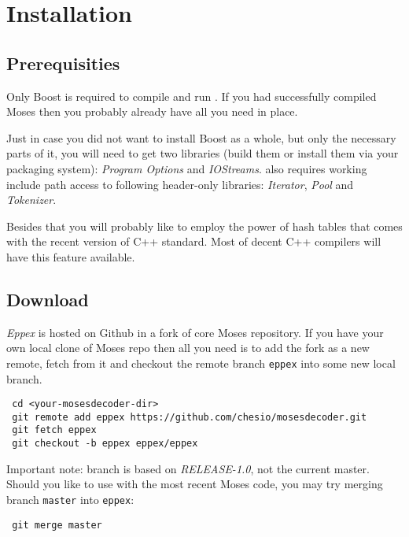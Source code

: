 \chapter{Installation}
\label{chap:installation}


\section*{Prerequisities}

Only Boost is required to compile and run \eppex{}.
If you had successfully compiled Moses then you probably already have all you need in place.

Just in case you did not want to install Boost as a whole, but only the necessary
parts of it, you will need to get two libraries (build them or install
them via your packaging system): \emph{Program Options} and \emph{IOStreams}.
\Eppex{} also requires working include path access to following
header-only libraries: \emph{Iterator}, \emph{Pool} and \emph{Tokenizer}.

Besides that you will probably like to employ the power of hash tables
that comes with the recent version of C++ standard.
Most of decent C++ compilers will have this feature available.

\section*{Download}

\emph{Eppex} is hosted on Github in
a fork
of core Moses repository.
If you have your own local clone of Moses repo then all you need is to add
the fork as a new remote, fetch from it and checkout the remote branch
\texttt{eppex} into some new local branch.
\begin{verbatim}
 cd <your-mosesdecoder-dir>
 git remote add eppex https://github.com/chesio/mosesdecoder.git
 git fetch eppex
 git checkout -b eppex eppex/eppex
\end{verbatim}

Important note: \eppex{} branch is based on \emph{RELEASE-1.0},
not the current master. Should you like to use \eppex{} with the most
recent Moses code, you may try merging branch \texttt{master} into \texttt{eppex}:
\begin{verbatim}
 git merge master
\end{verbatim}

